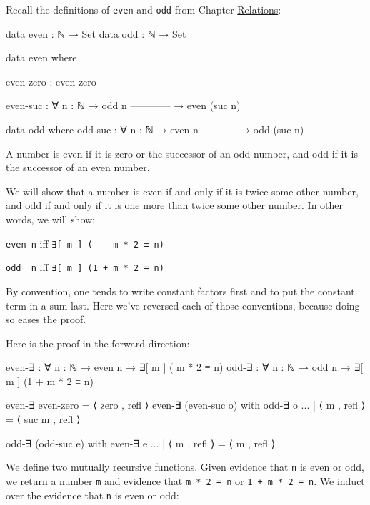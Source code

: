 Recall the definitions of \texttt{even} and \texttt{odd} from Chapter
\protect\hyperlink{Relations}{Relations}:

\begin{fence}
\begin{code}
data even : ℕ → Set
data odd  : ℕ → Set

data even where

  even-zero : even zero

  even-suc : ∀ {n : ℕ}
    → odd n
      ------------
    → even (suc n)

data odd where
  odd-suc : ∀ {n : ℕ}
    → even n
      -----------
    → odd (suc n)
\end{code}
\end{fence}

A number is even if it is zero or the successor of an odd number, and
odd if it is the successor of an even number.

We will show that a number is even if and only if it is twice some other
number, and odd if and only if it is one more than twice some other
number. In other words, we will show:

\texttt{even\ n} iff \texttt{∃{[}\ m\ {]}\ (\ \ \ \ m\ *\ 2\ ≡\ n)}

\texttt{odd\ \ n} iff \texttt{∃{[}\ m\ {]}\ (1\ +\ m\ *\ 2\ ≡\ n)}

By convention, one tends to write constant factors first and to put the
constant term in a sum last. Here we've reversed each of those
conventions, because doing so eases the proof.

Here is the proof in the forward direction:

\begin{fence}
\begin{code}
even-∃ : ∀ {n : ℕ} → even n → ∃[ m ] (    m * 2 ≡ n)
odd-∃  : ∀ {n : ℕ} →  odd n → ∃[ m ] (1 + m * 2 ≡ n)

even-∃ even-zero                       =  ⟨ zero , refl ⟩
even-∃ (even-suc o) with odd-∃ o
...                    | ⟨ m , refl ⟩  =  ⟨ suc m , refl ⟩

odd-∃  (odd-suc e)  with even-∃ e
...                    | ⟨ m , refl ⟩  =  ⟨ m , refl ⟩
\end{code}
\end{fence}

We define two mutually recursive functions. Given evidence that
\texttt{n} is even or odd, we return a number \texttt{m} and evidence
that \texttt{m\ *\ 2\ ≡\ n} or \texttt{1\ +\ m\ *\ 2\ ≡\ n}. We induct
over the evidence that \texttt{n} is even or odd:

